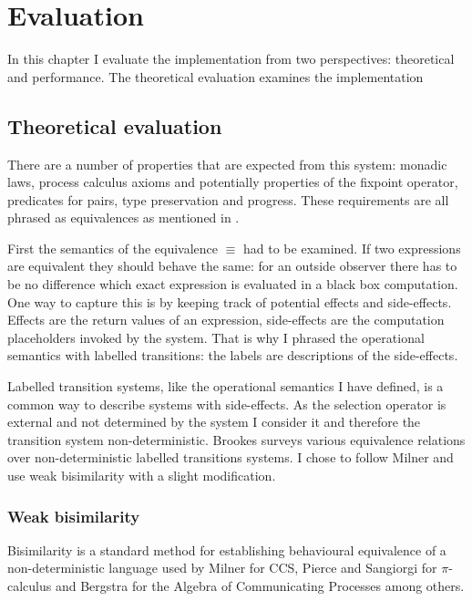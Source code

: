\documentclass[12pt,twoside,notitlepage]{report}
\theoremstyle{plain}%
\theoremstyle{definition}
\theoremstyle{remark}
\begin{document}
\cleardoublepage
\chapter{Evaluation}
In this chapter I evaluate the implementation from two perspectives: theoretical and performance. The theoretical evaluation examines the implementation 


\section{Theoretical evaluation}
\label{sec:behave_equiv}
There are a number of properties that are expected from this system: monadic laws, process calculus axioms and potentially properties of the fixpoint operator, predicates for pairs, type preservation and progress. These requirements are all phrased as equivalences as mentioned in . 

First the semantics of the equivalence $ \equiv $ had to be examined. If two expressions are equivalent they should behave the same: for an outside observer there has to be no difference which exact expression is evaluated in a black box computation. One way to capture this is by keeping track of potential effects and side-effects. Effects are the return values of an expression, side-effects are the computation placeholders invoked by the system. That is why I phrased the operational semantics with labelled transitions: the labels are descriptions of the side-effects.

Labelled transition systems, like the operational semantics I have defined, is a common way to describe systems with side-effects. As the selection operator is external and not determined by the system I consider it and therefore the transition system non-deterministic. Brookes\cite{brookes1983behavioural} surveys various equivalence relations over non-deterministic labelled transitions systems. I chose to follow Milner\cite{milner1982calculus} and use weak bisimilarity with a slight modification.

\subsection{Weak bisimilarity}
Bisimilarity is a standard method for establishing behavioural equivalence of a non-deterministic language used by Milner for CCS\cite{milner1982calculus}, Pierce and Sangiorgi for $ \pi $-calculus\cite{pierce2000behavioral} and Bergstra for the Algebra of Communicating Processes\cite{bergstra1986algebra,bergstra1985algebra} among others. 
\end{document}
